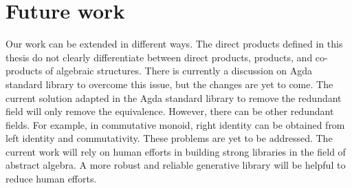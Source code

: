 \section{Future work}
\label{future}
Our work can be extended in different ways. The direct products defined in this
thesis do not clearly differentiate between direct products, products, and
co-products of algebraic structures. There is currently a discussion on Agda
standard library to overcome this issue, but the changes are yet to come. The
current solution adapted in the Agda standard library to remove the redundant
field will only remove the equivalence. However, there can be other redundant
fields. For example, in commutative monoid, right identity can be obtained from
left identity and commutativity. These problems are yet to be addressed. The
current work will rely on human efforts in building strong libraries in the
field of abstract algebra. A more robust and reliable generative library will be
helpful to reduce human efforts.